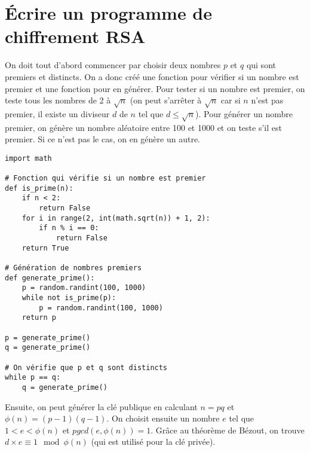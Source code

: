 \section{Écrire un programme de chiffrement RSA}

On doit tout d'abord commencer par choisir deux nombres $p$ et $q$ qui sont premiers et distincts. On a donc créé une fonction pour vérifier si un nombre est premier et une fonction pour en générer. Pour tester si un nombre est premier, on teste tous les nombres de 2 à $\sqrt{n}$ (on peut s'arrêter à $\sqrt{n}$ car si $n$ n'est pas premier, il existe un diviseur $d$ de $n$ tel que $d \leq \sqrt{n}$). Pour générer un nombre premier, on génère un nombre aléatoire entre 100 et 1000 et on teste s'il est premier. Si ce n'est pas le cas, on en génère un autre. \\

\begin{tcolorbox}[
    enhanced,
    attach boxed title to top left={xshift=6mm,yshift=-3mm},
    colback=lightgreen!20,
    colframe=lightgreen,
    colbacktitle=lightgreen,
    title=Test de primalité et génération de nombres premiers,
    fonttitle=\bfseries\color{black},
    boxed title style={size=small,colframe=lightgreen,sharp corners},
    sharp corners,
]    
    \begin{verbatim}
import math

# Fonction qui vérifie si un nombre est premier
def is_prime(n):
    if n < 2:
        return False
    for i in range(2, int(math.sqrt(n)) + 1, 2):
        if n % i == 0:
            return False
    return True

# Génération de nombres premiers
def generate_prime():
    p = random.randint(100, 1000)
    while not is_prime(p):
        p = random.randint(100, 1000)
    return p

p = generate_prime()
q = generate_prime()

# On vérifie que p et q sont distincts
while p == q:
    q = generate_prime()

    \end{verbatim}
\end{tcolorbox}

Ensuite, on peut générer la clé publique en calculant $n = pq$ et $\phi(n) = (p-1)(q-1)$. On choisit ensuite un nombre $e$ tel que $1 < e < \phi(n)$ et $pgcd(e, \phi(n)) = 1$. Grâce au théorème de Bézout, on trouve $d \times e \equiv 1 \mod \phi(n)$ (qui est utilisé pour la clé privée). \\

